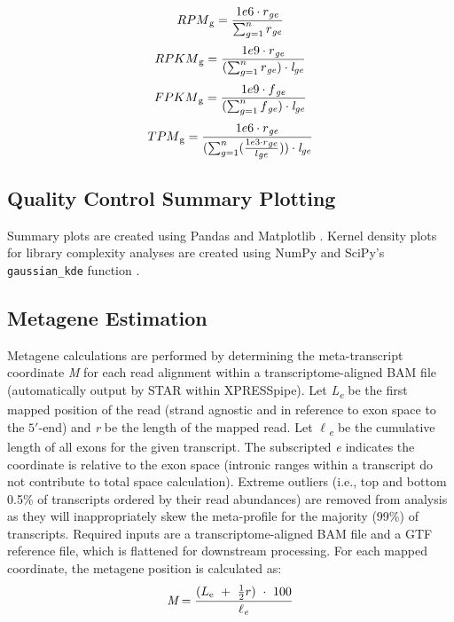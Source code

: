 \documentclass[10pt, oneside]{article}
\begin{document}
  \begin{equation}
    RPM\textsubscript{g} = \frac{1e6 \cdot r\textsubscript{\textit{ge}}}{\sum_{g=1}^{n} r\textsubscript{\textit{ge}}}
  \end{equation}
  \begin{equation}
    RPKM\textsubscript{g} = \frac{1e9 \cdot r\textsubscript{\textit{ge}}}{(\sum_{g=1}^{n} r\textsubscript{\textit{ge}}) \cdot \textit{l} \textsubscript{\textit{ge}}}
  \end{equation}
  \begin{equation}
    FPKM\textsubscript{g} = \frac{1e9 \cdot f\textsubscript{\textit{ge}}}{(\sum_{g=1}^{n} f\textsubscript{\textit{ge}}) \cdot \textit{l} \textsubscript{\textit{ge}}}
  \end{equation}
  \begin{equation}
    TPM\textsubscript{g} = \frac{1e6 \cdot r\textsubscript{\textit{ge}}}{(\sum_{g=1}^{n} (\frac{1e3 \cdot r\textsubscript{\textit{ge}}}{l\textsubscript{\textit{ge}}})) \cdot \textit{l} \textsubscript{\textit{ge}}}
  \end{equation}


\subsection{Quality Control Summary Plotting}
Summary plots are created using Pandas \cite{pandas} and Matplotlib \cite{matplotlib}. Kernel density plots for library complexity analyses are created using NumPy \cite{numpy1, numpy2} and SciPy's \texttt{gaussian\_kde} function \cite{scipy}.

\subsection{Metagene Estimation}
Metagene calculations are performed by determining the meta-transcript coordinate \textit{M} for each read alignment within a transcriptome-aligned BAM file (automatically output by STAR within XPRESSpipe). Let \textit{L\textsubscript{e}} be the first mapped position of the read (strand agnostic and in reference to exon space to the $5'$-end) and \textit{r} be the length of the mapped read. Let \textit{$\ell$\textsubscript{e}} be the cumulative length of all exons for the given transcript. The subscripted \textit{e} indicates the coordinate is relative to the exon space (intronic ranges within a transcript do not contribute to total space calculation). Extreme outliers (i.e., top and bottom 0.5\% of transcripts ordered by their read abundances) are removed from analysis as they will inappropriately skew the meta-profile for the majority (99\%) of transcripts. Required inputs are a transcriptome-aligned BAM file and a GTF reference file, which is flattened for downstream processing. For each mapped coordinate, the metagene position is calculated as:
\begin{equation}
\textit{M} = \frac{(L\textsubscript{e}\ +\ \frac{1}{2}r)\ \cdot\ 100}{\textit{$\ell$\textsubscript{e}}}
\end{equation}
\end{document}
